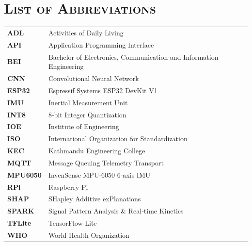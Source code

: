 
\chapter*{\scshape List of Abbreviations}
\begin{longtable}{@{}p{3.5cm}p{10.5cm}@{}}
\textbf{ADL}     & Activities of Daily Living \\[4pt]
\textbf{API}     & Application Programming Interface \\[4pt]
\textbf{BEI}     & Bachelor of Electronics, Communication and Information Engineering \\[4pt]
\textbf{CNN}     & Convolutional Neural Network \\[4pt]
\textbf{ESP32}   & Espressif Systems ESP32 DevKit V1 \\[4pt]
\textbf{IMU}     & Inertial Measurement Unit \\[4pt]
\textbf{INT8}    & 8-bit Integer Quantization \\[4pt]
\textbf{IOE}     & Institute of Engineering \\[4pt]
\textbf{ISO}     & International Organization for Standardization \\[4pt]
\textbf{KEC}     & Kathmandu Engineering College \\[4pt]
\textbf{MQTT}    & Message Queuing Telemetry Transport \\[4pt]
\textbf{MPU6050} & InvenSense MPU-6050 6-axis IMU \\[4pt]
\textbf{RPi}     & Raspberry Pi \\[4pt]
\textbf{SHAP}    & SHapley Additive exPlanations \\[4pt]
\textbf{SPARK}   & Signal Pattern Analysis \& Real-time Kinetics \\[4pt]
\textbf{TFLite}  & TensorFlow Lite \\[4pt]
\textbf{WHO}     & World Health Organization \\[4pt]
\end{longtable}
